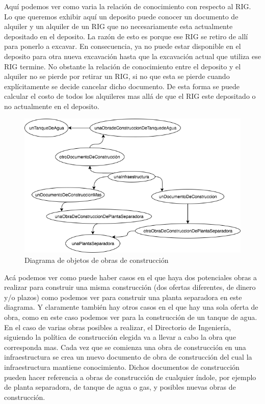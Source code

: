 \documentclass[10pt,a4paper]{article}
\begin{document}
Aquí podemos ver como varia la relación de conocimiento con respecto al RIG. Lo que queremos exhibir aquí un deposito puede conocer un documento de alquiler y un alquiler de un RIG que no necesariamente esta actualmente depositado en el deposito. La razón de esto es porque ese RIG se retiro de allí para ponerlo a excavar. En consecuencia, ya no puede estar disponible en el deposito para otra nueva excavación hasta que la excavación actual que utiliza ese RIG termine. No obstante la relación de conocimiento entre el deposito y el alquiler no se pierde por retirar un RIG, si no que esta se pierde cuando explícitamente se decide cancelar dicho documento. De esta forma se puede calcular el costo de todos los alquileres mas allá de que el RIG este depositado o no actualmente en el deposito.

\begin{figure}[H]
\centerline{\includegraphics[scale=0.4]{images/DiagramaDeObjetosDeObrasDeContruccion.png}}
\caption{Diagrama de objetos de obras de construcción}
\end{figure}

Acá podemos ver como puede haber casos en el que haya dos potenciales obras a realizar para construir una misma construcción (dos ofertas diferentes, de dinero y/o plazos) como podemos ver para construir una planta separadora en este diagrama. Y claramente también hay otros casos en el que hay una sola oferta de obra, como en este caso podemos ver para la construcción de un tanque de agua. En el caso de varias obras posibles a realizar, el Directorio de Ingeniería, siguiendo la política de construcción elegida va a llevar a cabo la obra que corresponda mas.
Cada vez que se comienza una obra de construcción en una infraestructura se crea un nuevo documento de obra de construcción del cual la infraestructura mantiene conocimiento. Dichos documentos de construcción pueden hacer referencia a obras de construcción de cualquier índole, por ejemplo de planta separadora, de tanque de agua o gas, y posibles nuevas obras de construcción.
\pagebreak
\end{document}
